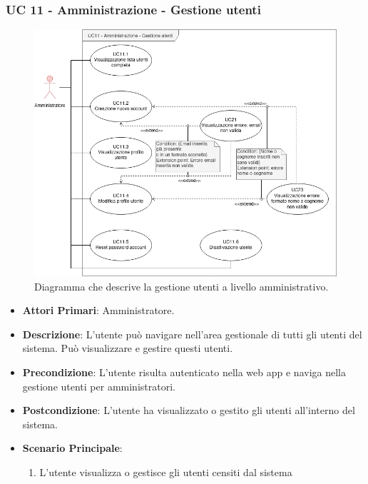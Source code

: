 \subsubsection{UC 11 - Amministrazione - Gestione utenti}

		\begin{figure}[H]
			\centering
			\includegraphics[scale=0.60]{res/images/uc11}
			\caption{Diagramma che descrive la gestione utenti a livello amministrativo.}
		\end{figure}

		\begin{itemize}
			\item \textbf{Attori Primari}: Amministratore.
			\item \textbf{Descrizione}: L'utente può navigare nell'area gestionale di tutti gli utenti del sistema. Può visualizzare e gestire questi utenti. 
			\item \textbf{Precondizione}: L'utente risulta autenticato nella web app e naviga nella gestione utenti per amministratori.
			\item \textbf{Postcondizione}: L'utente ha visualizzato o gestito gli utenti all'interno del sistema. 
			\item \textbf{Scenario Principale}:
			\begin{enumerate}
				\item{L'utente visualizza o gestisce gli utenti censiti dal sistema}
			\end{enumerate}	
		\end{itemize}

